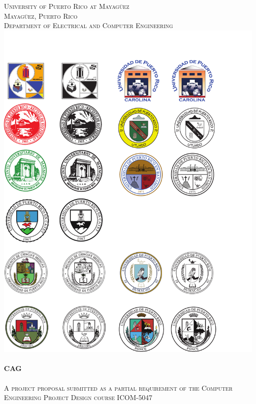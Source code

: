 \begin{titlepage}

\begin{center}


    

\textsc{\large University of Puerto Rico at Mayag\"{u}ez}\\[0.5cm]
\textsc{\large Mayag\"{u}ez, Puerto Rico}\\[0.5cm]
\textsc{\normalsize Department of Electrical and Computer Engineering}\\[1.5cm]
\includegraphics[scale=1.25]{res/logo_rum}\\[1cm]


\HRule \\[0.5cm]
{ \huge \bfseries CAG}\\[0.2cm]
\HRule \\[0.5cm]
\textsc{A project proposal submitted as a partial requirement of the Computer Engineering Project Design course ICOM-5047}\\[0.5cm]


\end{center}
\end{titlepage}
